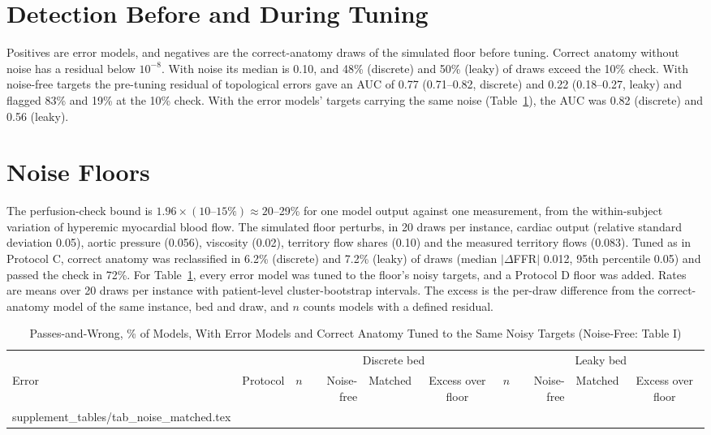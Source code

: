 \documentclass[journal,twoside,web,onecolumn]{ieeecolor}
\begin{document}
\FloatBarrier
{}
\section{Detection Before and During Tuning}\label{sec:detector}
Positives are error models, and negatives are the correct-anatomy draws of the simulated floor before tuning. Correct anatomy without noise has a residual below $10^{-8}$. With noise its median is 0.10, and 48\% (discrete) and 50\% (leaky) of draws exceed the 10\% check. With noise-free targets the pre-tuning residual of topological errors gave an AUC of 0.77 (0.71--0.82, discrete) and 0.22 (0.18--0.27, leaky) and flagged 83\% and 19\% at the 10\% check. With the error models' targets carrying the same noise (Table~\ref{tab:matched}), the AUC was 0.82 (discrete) and 0.56 (leaky).

\FloatBarrier
{}
\section{Noise Floors}\label{sec:floor}
The perfusion-check bound is $1.96 \times (10\text{--}15\%) \approx 20$--29\% for one model output against one
measurement, from the within-subject variation of hyperemic myocardial blood flow. The simulated floor perturbs,
in 20 draws per instance, cardiac output (relative standard deviation 0.05), aortic pressure (0.056), viscosity (0.02),
territory flow shares (0.10) and the measured territory flows (0.083). Tuned as in Protocol C, correct anatomy was reclassified in 6.2\% (discrete) and 7.2\% (leaky) of draws (median $|\Delta$FFR$|$ 0.012, 95th percentile 0.05) and passed the check in 72\%.
For Table~\ref{tab:matched}, every error model was tuned to the floor's noisy targets, and a Protocol D floor was added. Rates are means over 20 draws per instance with patient-level cluster-bootstrap intervals. The excess is the per-draw difference from the correct-anatomy model of the same instance, bed and draw, and $n$ counts models with a defined residual.
\begin{table}[!ht]
\caption{Passes-and-Wrong, \% of Models, With Error Models and Correct Anatomy Tuned to the Same Noisy Targets (Noise-Free: Table I)}\label{tab:matched}
\centering\footnotesize\setlength{\tabcolsep}{4pt}
\begin{tabular}{@{}llrrccrrcc@{}}
\toprule
 & & \multicolumn{4}{c}{Discrete bed} & \multicolumn{4}{c}{Leaky bed}\\
\cmidrule(lr){3-6}\cmidrule(l){7-10}
Error & Protocol & $n$ & Noise-free & Matched & Excess over floor & $n$ & Noise-free & Matched & Excess over floor\\
\midrule
{} supplement_tables/tab_noise_matched.tex 
\bottomrule
\end{tabular}
\end{table}
\end{document}
